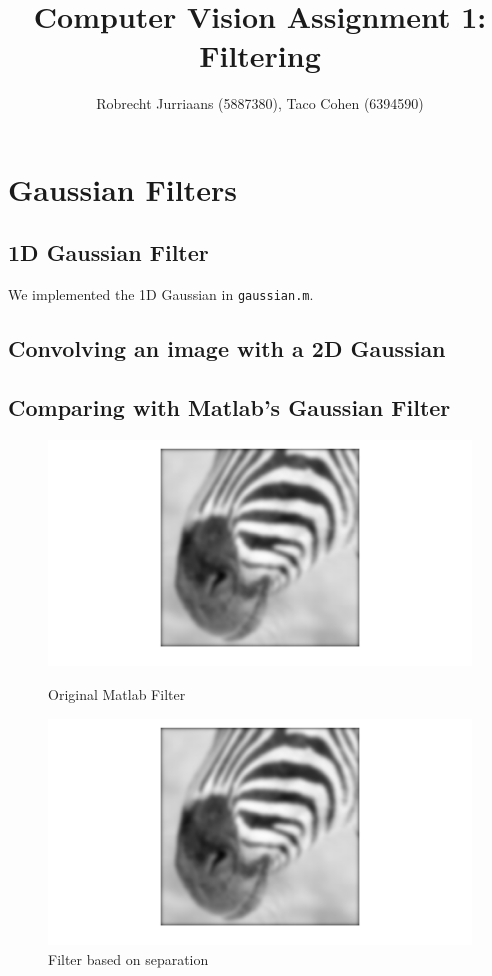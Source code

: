 \documentclass[a4paper,10pt]{article}
\title{Computer Vision Assignment 1: Filtering}
\author{Robrecht Jurriaans (5887380), Taco Cohen (6394590)}
\begin{document}
\maketitle

\section{Gaussian Filters}

\subsection{1D Gaussian Filter}
We implemented the 1D Gaussian in \verb+gaussian.m+.

\subsection{Convolving an image with a 2D Gaussian}


\subsection{Comparing with Matlab's Gaussian Filter}
\begin{figure}[ht]
\begin{minipage}[b]{0.45\linewidth}
\centering
\includegraphics[width=\textwidth]{zebra_img/matlabfilter}
\caption{Original Matlab Filter}
\end{minipage}
\hspace{0.1cm}
\begin{minipage}[b]{0.45\linewidth}
\centering
\includegraphics[width=\textwidth]{zebra_img/separatedfilter}
\caption{Filter based on separation}
\end{minipage}
\end{figure}
\end{document}

